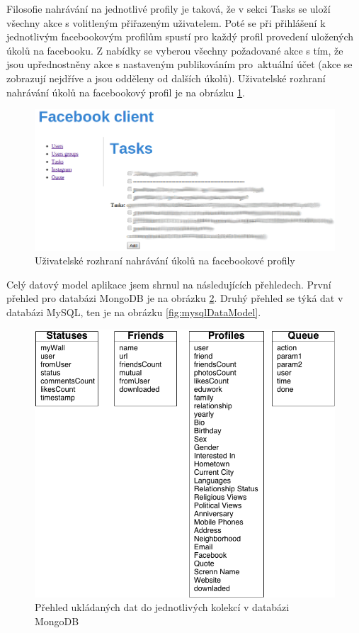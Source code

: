 \documentclass[thesis=M,czech]{FITthesis}[2013/05/10]
\begin{document}
Filosofie nahrávání na jednotlivé profily je taková, že v sekci Tasks se uloží všechny akce s volitleným přiřazeným uživatelem. Poté se při přihlášení k jednotlivým facebookovým profilům spustí pro každý profil provedení uložených úkolů na facebooku. Z nabídky se vyberou všechny požadované akce s tím, že jsou upřednostněny akce s nastaveným publikováním pro~aktuální účet (akce se zobrazují nejdříve a jsou odděleny od dalších úkolů). Uživatelské rozhraní nahrávání úkolů na facebookový profil je na obrázku \ref{fig:fcUserTask}.

\begin{figure}[h]
\begin{center}
\includegraphics[width=5in]{figures/fcUserTask.png}
\caption{Uživatelské rozhraní nahrávání úkolů na facebookové profily}
\label{fig:fcUserTask}
\end{center}
\end{figure}

Celý datový model aplikace jsem shrnul na následujících přehledech. První přehled pro databázi MongoDB je na obrázku \ref{fig:mongoDataModel}. Druhý přehled se týká dat v databázi MySQL, ten je na obrázku \ref{fig:mysqlDataModel}.

\begin{figure}[h]
\begin{center}
\includegraphics[width=5in]{figures/mongoDataModel.png}
\caption{Přehled ukládaných dat do jednotlivých kolekcí v databázi MongoDB}
\label{fig:mongoDataModel}
\end{center}
\end{figure}
\end{document}
